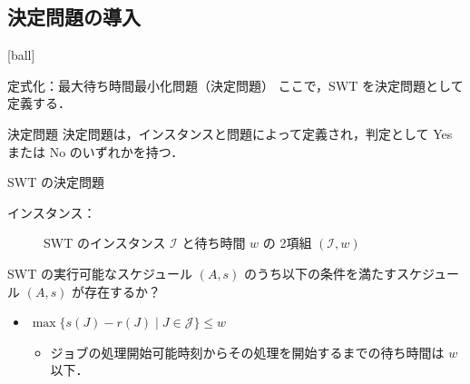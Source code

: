 \documentclass[dvipdfmx]{beamer}
\begin{document}
    \subsection{決定問題の導入}
    [ball]
    \begin{frame}{定式化：最大待ち時間最小化問題（決定問題）}
      ここで，SWT を\alert{決定問題}として定義する．
      \begin{block}{決定問題}
        決定問題は，インスタンスと問題によって定義され，判定として \alert{Yes} または \alert{No} のいずれかを持つ．
      \end{block}

      \begin{block}{SWT の決定問題}
        \begin{description}
          \item[インスタンス：] SWT のインスタンス $\mathcal{I}$ と待ち時間 $w$ の 2項組 $(\mathcal{I}, w)$
        \end{description}
        \begin{description}
          \setlength{\leftskip}{-8mm}
          \item[問題：] SWT の実行可能なスケジュール $(A,s)$ のうち以下の条件を満たすスケジュール $(A,s)$ が存在するか？
          \vspace{-2mm}
        \end{description}
        \begin{itemize}
          \item {$\max\big\{s(J) - r(J) \mid J \in \mathcal{J}\big\} \le w$}
          \begin{itemize}
            \item ジョブの処理開始可能時刻からその処理を開始するまでの待ち時間は $w$ 以下．
          \end{itemize}
        \end{itemize}
      \end{block}
    \end{frame}
\end{document}
